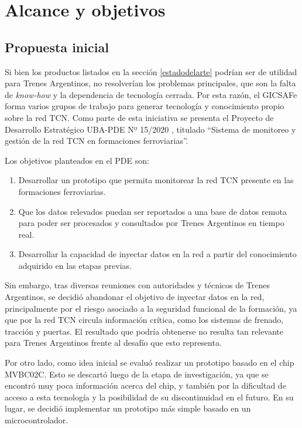 \pagebreak

\section{Alcance y objetivos}
\subsection{Propuesta inicial}
\label{sec:propuesta}

Si bien los productos listados en la sección \ref{estadodelarte} podrían ser de utilidad para Trenes Argentinos, no resolverían los problemas principales, que son la falta de \emph{know-how} y la dependencia de tecnología cerrada. Por esta razón, el GICSAFe forma varios grupos de trabajo para generar tecnología y conocimiento propio sobre la red TCN. Como parte de esta iniciativa se presenta el Proyecto de Desarrollo Estratégico UBA-PDE Nº 15/2020 \cite{pde2020}, titulado ``Sistema de monitoreo y gestión de la red TCN en formaciones ferroviarias''.

Los objetivos planteados en el PDE son:

\begin{enumerate}
\item Desarrollar un prototipo que permita monitorear la red TCN presente en las formaciones ferroviarias.
\item Que los datos relevados puedan ser reportados a una base de datos remota para poder ser procesados y consultados por Trenes Argentinos en tiempo real.
\item Desarrollar la capacidad de inyectar datos en la red a partir del conocimiento adquirido en las etapas previas.
\end{enumerate}

Sin embargo, tras diversas reuniones con autoridades y técnicos de Trenes Argentinos, se decidió abandonar el objetivo de inyectar datos en la red, principalmente por el riesgo asociado a la seguridad funcional de la formación, ya que por la red TCN circula información crítica, como los sistemas de frenado, tracción y puertas.
El resultado que podría obtenerse no resulta tan relevante para Trenes Argentinos frente al desafío que esto representa.

Por otro lado, como idea inicial se evaluó realizar un prototipo basado en el chip MVBC02C.
Esto se descartó luego de la etapa de investigación, ya que se encontró muy poca información acerca del chip, y también por la dificultad de acceso a esta tecnología y la posibilidad de su discontinuidad en el futuro.
En su lugar, se decidió implementar un prototipo más simple basado en un microcontrolador.

